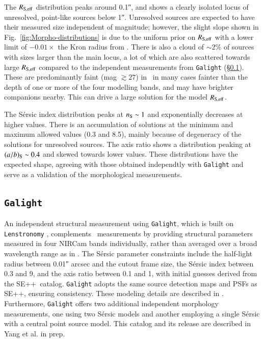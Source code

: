 \documentclass[longauth]{aa}
\begin{document}
The $R_{\rm S,eff}$ distribution peaks around \ang{;;0.1}, and shows a clearly isolated locus of unresolved, point-like sources below \ang{;;1}. Unresolved sources are expected to have their measured size independent of magnitude; however, the slight slope shown in Fig.~\ref{fig:Morpho-distributions} is due to the uniform prior on $R_{\rm S,eff}$ with a lower limit of $-0.01\times$ the Kron radius from \hotcold. There is also a cloud of $\sim 2\%$ of sources with sizes larger than the main locus, a lot of which are also scattered towards large $R_{\rm S,eff}$ compared to the independent measurements from \texttt{Galight} (\S \ref{sec:galight}). These are predominantly faint (mag $\gtrsim 27$) in \hotcold\, in many cases fainter than the depth of one or more of the four modelling bands, and may have brighter companions nearby. This can drive a large solution for the model $R_{\rm S,eff}$. 

The S\'ersic index distribution peaks at $n_{\rm S}\sim 1$ and exponentially decreases at higher values. There is an accumulation of solutions at the minimum and maximum allowed values (0.3 and 8.5), mainly because of degeneracy of the solutions for unresolved sources. The axis ratio shows a distribution peaking at $(a/b)_{\rm S}\sim 0.4$ and skewed towards lower values. These distributions have the expected shape, agreeing with those obtained independtly with \texttt{Galight} and serve as a validation of the morphological measurements.

\subsection{\texttt{Galight}} \label{sec:galight}
An independent structural measurement using \texttt{Galight}, which is built on \texttt{Lenstronomy} \citep{Ding2020, Birrer2021}, complements \SEpp\ measurements by providing structural parameters measured in four NIRCam bands individually, rather than averaged over a broad wavelength range as in \SEpp.
The S\'ersic parameter constraints include the half-light radius between \ang{;;0.01} arcsec and the cutout frame size, the S\'ersic index between 0.3 and 9, and the axis ratio between 0.1 and 1, with initial guesses derived from the SE++\ catalog. \texttt{Galight} adopts the same source detection maps and PSFs as SE++, ensuring consistency. These modeling details are described in \cite{Yang2025}. Furthermore, \texttt{Galight} offers two additional independent morphology measurements,  one using two S\'ersic models and another employing a single S\'ersic  with a central point source model. This catalog and its release are described in Yang et al. in prep.
\end{document}
